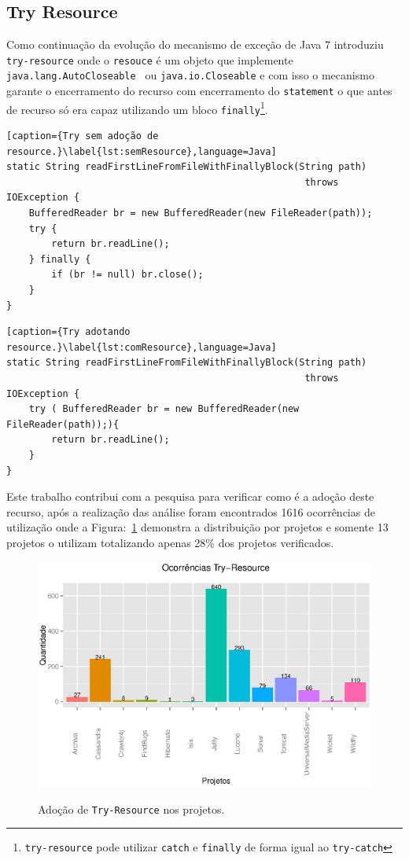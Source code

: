 \subsection{Try Resource}
Como continuação da evolução do mecanismo de exceção de Java 7 introduziu \texttt{try-resource} onde o \texttt{resouce} é um objeto que implemente \texttt{java.lang.AutoCloseable } ou \texttt{java.io.Closeable} e com isso o mecanismo garante o encerramento do recurso com encerramento do \texttt{statement} o que antes de recurso só era capaz utilizando um bloco \texttt{finally}\footnote{\texttt{try-resource} pode utilizar \texttt{catch} e \texttt{finally} de forma igual ao \texttt{try-catch}}.

\begin{lstlisting}[caption={Try sem adoção de resource.}\label{lst:semResource},language=Java]
static String readFirstLineFromFileWithFinallyBlock(String path)
                                                     throws IOException {
    BufferedReader br = new BufferedReader(new FileReader(path));
    try {
        return br.readLine();
    } finally {
        if (br != null) br.close();
    }
}
\end{lstlisting}

\begin{lstlisting}[caption={Try adotando resource.}\label{lst:comResource},language=Java]
static String readFirstLineFromFileWithFinallyBlock(String path)
                                                     throws IOException {
    try ( BufferedReader br = new BufferedReader(new FileReader(path));){
        return br.readLine();
    } 
}
\end{lstlisting}

Este trabalho contribui com a pesquisa para verificar como é a adoção deste recurso, após a realização das análise foram encontrados \num{1616} ocorrências de utilização onde a Figura:~\ref{fig:Try-Resource} demonstra a distribuição por projetos e somente 13 projetos o utilizam totalizando apenas \num{28}\% dos projetos verificados.

\begin{figure}[h]
	\center
	\includegraphics[scale=0.55]{Imagens/ocorrenciasTryResource}
	\label{fig:Try-Resource}
	\caption{Adoção de \texttt{Try-Resource} nos projetos.}
\end{figure}

